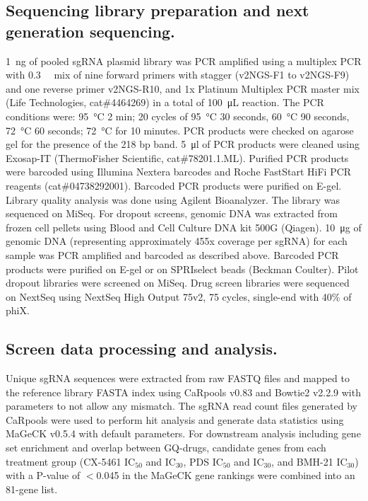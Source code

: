 \subsection{Sequencing library preparation and next generation sequencing.}
\SI{1}{\nano\gram} of pooled sgRNA plasmid library was PCR amplified using a multiplex PCR with \SI{0.3}{\micro\Molar} mix of nine forward primers with stagger (v2NGS-F1 to v2NGS-F9) and one reverse primer v2NGS-R10, and 1x Platinum Multiplex PCR master mix (Life Technologies, cat\#4464269) in a total of \SI{100}{\micro\liter} reaction. The PCR conditions were: \SI{95}{\celsius} 2 min; 20 cycles of \SI{95}{\celsius} 30 seconds, \SI{60}{\celsius} 90 seconds, \SI{72}{\celsius} 60 seconds; \SI{72}{\celsius} for 10 minutes. PCR products were checked on agarose gel for the presence of the 218 bp band. \SI{5}{\micro\litre} of PCR products were cleaned using Exosap-IT (ThermoFisher Scientific, cat\#78201.1.ML). Purified PCR products were barcoded using Illumina Nextera barcodes and Roche FastStart HiFi PCR reagents (cat\#04738292001). Barcoded PCR products were purified on E-gel. Library quality analysis was done using Agilent Bioanalyzer. The library was sequenced on MiSeq. 
For dropout screens, genomic DNA was extracted from frozen cell pellets using Blood and Cell Culture DNA kit 500G (Qiagen). \SI{10}{\micro\gram} of genomic DNA (representing approximately 455x coverage per sgRNA) for each sample was PCR amplified and barcoded as described above. Barcoded PCR products were purified on E-gel or on SPRIselect beads (Beckman Coulter). Pilot dropout libraries were screened on MiSeq. Drug screen libraries were sequenced on NextSeq using NextSeq High Output 75v2, 75 cycles, single-end with 40\% of phiX. 

\subsection{Screen data processing and analysis.}
Unique sgRNA sequences were extracted from raw FASTQ files and mapped to the reference library FASTA index using CaRpools v0.83 and Bowtie2 v2.2.9 with parameters to not allow any mismatch\cite{Winter2016,Langmead2012a}. The sgRNA read count files generated by CaRpools were used to perform hit analysis and generate data statistics using MaGeCK v0.5.4 with default parameters\cite{Li2014}. 
For downstream analysis including gene set enrichment and overlap between GQ-drugs, candidate genes from each treatment group (CX-5461 IC$_{50}$ and IC$_{30}$, PDS IC$_{50}$ and IC$_{30}$, and BMH-21 IC$_{30}$) with a P-value of $<$0.045 in the MaGeCK gene rankings were combined into an 81-gene list.  

